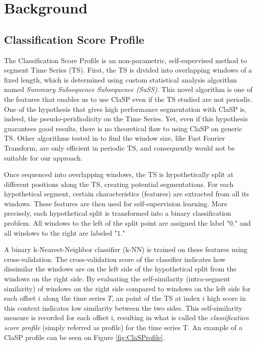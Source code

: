\documentclass[conference]{IEEEtran}
\begin{document}
\section{Background} \label{Background}

\subsection{Classification Score Profile}

The Classification Score Profile is an non-parametric, self-supervised method to segment Time Series (TS). First, the TS is divided into overlapping windows of a fixed length, which is determined using custom statistical analysis algorithm named \textit{Summary  Subsequence Subsequence (SuSS)}. This novel algorithm is one of the features that enables us to use ClaSP even if the TS studied are not periodic. One of the hypothesis that gives high performance segmentation with ClaSP is, indeed, the pseudo-peridiodicity on the Time Series. Yet, even if this hypothesis guarantees good results, there is no theoretical flaw to using ClaSP on generic TS. Other algorithms tested in \cite{clasp} to find the window size, like Fast Fourier Transform, are only efficient in periodic TS, and consequently would not be suitable for our approach.


Once sequenced into overlapping windows, the TS is hypothetically split at different positions along the TS, creating potential segmentations. For each hypothetical segment, certain characteristics (features) are extracted from all its windows. These features are then used for self-supervision learning.
More precisely, each hypothetical split is transformed into a binary classification problem. All windows to the left of the split point are assigned the label "$0$," and all windows to the right are labeled "$1$."

A binary k-Nearest-Neighbor classifier (k-NN) is trained on these features using cross-validation. The cross-validation score of the classifier indicates how dissimilar the windows are on the left side of the hypothetical split from the windows on the right side. By evaluating the self-similarity (intra-segment similarity) of windows on the right side compared to windows on the left side for each offset $i$ along the time series $T$, an point of the TS at index $i$ high score in this context indicates low similarity between the two sides. This self-similarity measure is recorded for each offset i, resulting in what is called the \textit{classification score profile} (simply referred as profile) for the time series T. An example of a ClaSP profile can be seen on Figure \ref{fig:ClaSProfile}.
\end{document}
